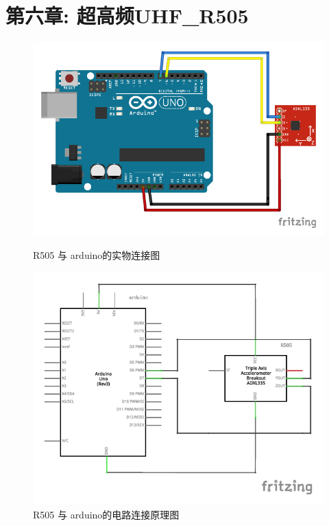\documentclass{article}
\begin{document}
\section{第六章: 超高频UHF\_R505}
\begin{figure}[h]
	\centering
	\begin{minipage}{.45\textwidth}
		\centering
		\includegraphics[width=\linewidth]{../6_Chapter6_UHF_R505/Picture/R505.pdf}
		\caption{R505 与 arduino的实物连接图}
		\label{fig:R505 与 arduino的实物连接图}
	\end{minipage}
	\hfill
	\begin{minipage}{.45\textwidth}
		\centering
		\includegraphics[width=\linewidth]{../6_Chapter6_UHF_R505/Picture/R505_line.pdf}
		\caption{R505 与 arduino的电路连接原理图}
		\label{fig:R505 与 arduino的电路连接原理图}
	\end{minipage}
\end{figure}
\end{document}
